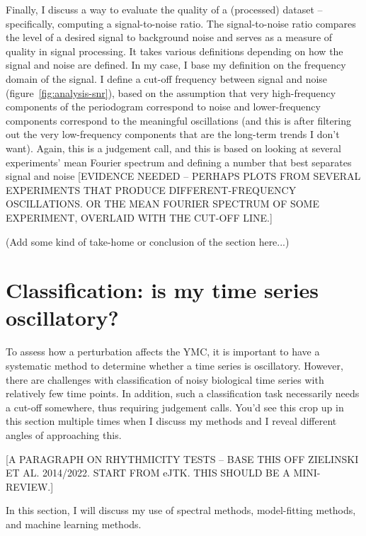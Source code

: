 Finally, I discuss a way to evaluate the quality of a (processed) dataset -- specifically, computing a signal-to-noise ratio.
The signal-to-noise ratio compares the level of a desired signal to background noise and serves as a measure of quality in signal processing.
It takes various definitions depending on how the signal and noise are defined.
In my case, I base my definition on the frequency domain of the signal.
I define a cut-off frequency between signal and noise (figure~\ref{fig:analysis-snr}), based on the assumption that very high-frequency components of the periodogram correspond to noise and lower-frequency components correspond to the meaningful oscillations (and this is after filtering out the very low-frequency components that are the long-term trends I don't want).
Again, this is a judgement call, and this is based on looking at several experiments' mean Fourier spectrum and defining a number that best separates signal and noise [EVIDENCE NEEDED -- PERHAPS PLOTS FROM SEVERAL EXPERIMENTS THAT PRODUCE DIFFERENT-FREQUENCY OSCILLATIONS.  OR THE MEAN FOURIER SPECTRUM OF SOME EXPERIMENT, OVERLAID WITH THE CUT-OFF LINE.]

(Add some kind of take-home or conclusion of the section here...)

\section{Classification: is my time series oscillatory?}
\label{sec:analysis-classification}

To assess how a perturbation affects the YMC, it is important to have a systematic method to determine whether a time series is oscillatory.
However, there are challenges with classification of noisy biological time series with relatively few time points.
In addition, such a classification task necessarily needs a cut-off somewhere, thus requiring judgement calls.
You'd see this crop up in this section multiple times when I discuss my methods and I reveal different angles of approaching this.

[A PARAGRAPH ON RHYTHMICITY TESTS -- BASE THIS OFF ZIELINSKI ET AL. 2014/2022.  START FROM eJTK.  THIS SHOULD BE A MINI-REVIEW.]

In this section, I will discuss my use of spectral methods, model-fitting methods, and machine learning methods.



